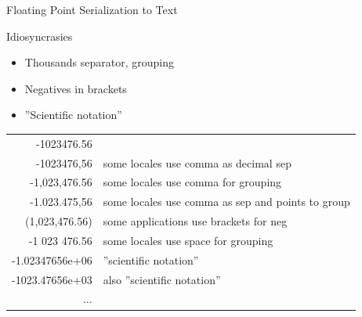 \documentclass[ignorenonframetext,xcolor=x11names]{beamer}
\begin{document}
\begin{frame}{Floating Point Serialization to Text}
\begin{block}{Idiosyncrasies}
\begin{itemize}
	\item Thousands separator, grouping
	\item Negatives in brackets
	\item ''Scientific notation''
\end{itemize}
\end{block}

\footnotesize
\centering
\vspace{5mm}
\renewcommand{\arraystretch}{1.25}

\begin{tabular}{r|l} \hline
-1023476.56 & \\
-1023476,56 & some locales use comma as decimal sep \\
-1,023,476.56 & some locales use comma for grouping \\
-1.023.475,56 & some locales use comma as sep and points to group \\
(1,023,476.56) & some applications use brackets for neg \\
-1 023 476.56 & some locales use space for grouping \\
-1.02347656e+06 & ''scientific notation'' \\
-1023.47656e+03 & also ''scientific notation'' \\
$\ldots$ & \\ \hline
\end{tabular}
\end{frame}
\end{document}
